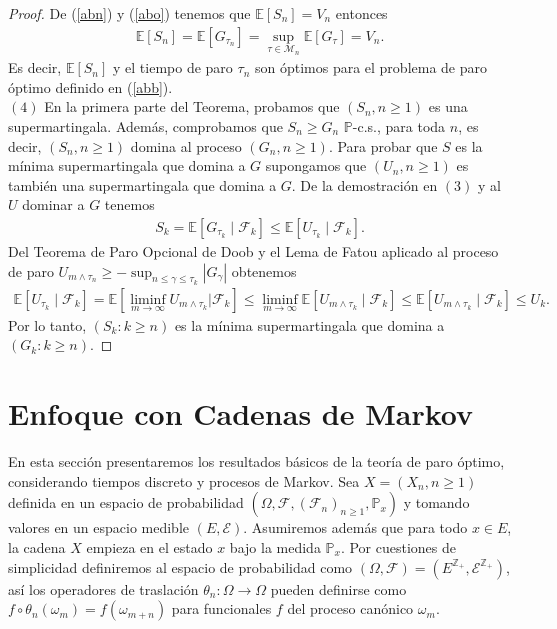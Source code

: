 \begin{proof}
De (\ref{abn}) y (\ref{abo}) tenemos que $\mathbb{E}[S_n] = V_n$ entonces
\begin{align*}
\mathbb{E}[S_n] = \mathbb{E}[G_{\tau_n}] = \sup_{\tau \in \mathcal{M}_n}\mathbb{E}[G_\tau] = V_n.
\end{align*}
Es decir, $\mathbb{E}[S_n]$ y el tiempo de paro $\tau_n$ son óptimos para el problema de paro óptimo definido en (\ref{abb}). \\

\noindent $(4)$ En la primera parte del Teorema, probamos que $(S_n, n \geq 1)$ es una supermartingala. Además, comprobamos que $S_n \geq G_n$ $\mathbb{P}$-c.s., para toda $n$, es decir, $(S_n, n \geq 1)$ domina al proceso $(G_n, n \geq 1)$. Para probar que $S$ es la mínima supermartingala que domina a $G$ supongamos que $(U_n, n \geq 1)$ es también una supermartingala que domina a $G$. De la demostración en $(3)$ y al $U$ dominar a $G$ tenemos
	\begin{align*}
	S_k = \mathbb{E}[G_{\tau_k} \mid \mathcal{F}_k] \leq \mathbb{E}[U_{\tau_k} \mid \mathcal{F}_k].
	\end{align*}
Del Teorema de Paro Opcional de Doob y el Lema de Fatou aplicado al proceso de paro $U_{m \wedge \tau_n} \geq - \sup_{n \leq \gamma \leq \tau_k} |G_\gamma|$ obtenemos
	\begin{align*}
	\mathbb{E}[U_{\tau_k} \mid \mathcal{F}_k] = \mathbb{E} \left[ \liminf_{m \rightarrow \infty} U_{m \wedge \tau_k } \bigg| \mathcal{F}_k \right] \leq \liminf_{m \rightarrow \infty} \mathbb{E}[U_{m \wedge \tau_k } \mid \mathcal{F}_k] \leq \mathbb{E}[U_{m \wedge \tau_k } \mid \mathcal{F}_k]  \leq U_k.
	\end{align*}
Por lo tanto, $(S_k : k \geq n)$ es la mínima supermartingala que domina a $(G_k : k \geq n)$.

\end{proof}

\section{Enfoque con Cadenas de Markov}
En esta sección presentaremos los resultados básicos de la teoría de paro óptimo, considerando tiempos discreto y procesos de Markov. Sea $X = (X_n, n \geq 1)$ definida en un espacio de probabilidad $(\Omega, \mathcal{F}, (\mathcal{F}_n)_{n \geq 1}, \mathbb{P}_x)$ y tomando valores en un espacio medible $(E, \mathcal{E})$. Asumiremos además que para todo $x \in E$, la cadena $X$ empieza en el estado $x$ bajo la medida $\mathbb{P}_x$. Por cuestiones de simplicidad  definiremos al espacio de probabilidad como $(\Omega, \mathcal{F}) = (E^{\mathbb{Z}_{+}}, \mathcal{E}^{\mathbb{Z}_{+}})$, así los operadores de traslación $\theta_n : \Omega \rightarrow \Omega$ pueden definirse como $f \circ \theta_n (\omega_{m}) = f(\omega_{m+n})$ para funcionales $f$ del proceso canónico $\omega_m$. \\

